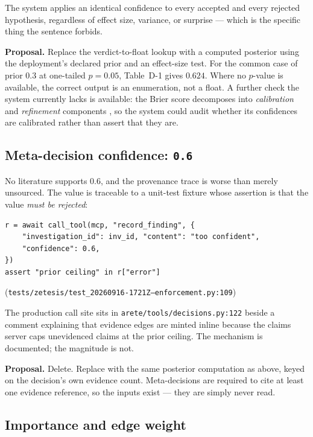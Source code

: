 \documentclass[11pt,letterpaper]{article}
\newcommand{\code}[1]{\texttt{#1}}
\begin{document}
The system applies an identical confidence to every accepted and every rejected
hypothesis, regardless of effect size, variance, or surprise --- which is the
specific thing the sentence forbids.

\textbf{Proposal.} Replace the verdict-to-float lookup with a computed posterior
using the deployment's declared prior and an effect-size test. For the common
case of prior $0.3$ at one-tailed $p = 0.05$, Table~D-1 gives \textbf{$0.624$}.
Where no $p$-value is available, the correct output is an enumeration, not a
float. A further check the system currently lacks is available: the Brier score
decomposes into \emph{calibration} and \emph{refinement} components
\cite{gneiting2007}, so the system could audit whether its confidences are
calibrated rather than assert that they are.

\subsection{Meta-decision confidence: \code{0.6}}

No literature supports $0.6$, and the provenance trace is worse than merely
unsourced. The value is traceable to a unit-test fixture whose assertion is that
the value \emph{must be rejected}:

\begin{lstlisting}
r = await call_tool(mcp, "record_finding", {
    "investigation_id": inv_id, "content": "too confident",
    "confidence": 0.6,
})
assert "prior ceiling" in r["error"]
\end{lstlisting}

\noindent
(\code{tests/zetesis/test\_20260916-1721Z--enforcement.py:109})

The production call site sits in \code{arete/tools/decisions.py:122} beside a
comment explaining that evidence edges are minted inline because the claims
server caps unevidenced claims at the prior ceiling. The mechanism is documented;
the magnitude is not.

\textbf{Proposal.} Delete. Replace with the same posterior computation as above,
keyed on the decision's own evidence count. Meta-decisions are required to cite
at least one evidence reference, so the inputs exist --- they are simply never
read.

\subsection{Importance and edge weight}
\end{document}
